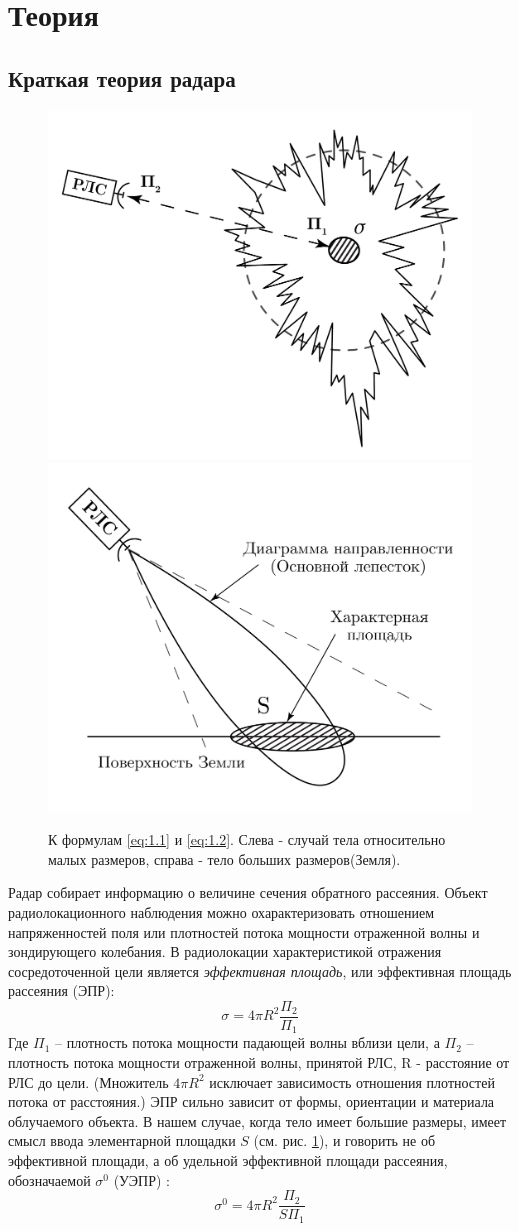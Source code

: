 \section{Теория}

\subsection{Краткая теория радара}
\begin{figure}[h!]
  \centering
  \includegraphics[width = .49\linewidth]{img/rls.pdf}
  \includegraphics[width = .49\linewidth]{img/rls2.pdf}
  \caption{К формулам \eqref{eq:1.1} и \eqref{eq:1.2}. Слева - случай тела относительно малых размеров, справа - тело больших размеров(Земля).}
  \label{fig:1}
\end{figure}
Радар собирает информацию о величине сечения обратного рассеяния. 
Объект радиолокационного наблюдения можно охарактеризовать отношением напряженностей поля или плотностей потока мощности
отраженной волны и зондирующего колебания. В радиолокации характеристикой отражения сосредоточенной цели
является \textit{эффективная площадь}, или эффективная площадь рассеяния (ЭПР)\cite{meln}:
\begin{equation}
  \sigma = 4 \pi R^2 \frac{\Pi_2}{\Pi_1}
  \label{eq:1.1}
\end{equation}
Где $\Pi_1$ – плотность потока мощности падающей волны вблизи цели, а $\Pi_2$ – плотность потока мощности отраженной
волны, принятой РЛС, R - расстояние от РЛС до цели. (Множитель $4 \pi R^2$  исключает зависимость отношения плотностей потока от
расстояния.) ЭПР сильно зависит от формы, ориентации и материала облучаемого объекта. В нашем случае, когда тело имеет
большие размеры, имеет смысл ввода элементарной площадки $S$ (см. рис. \ref{fig:1}), и говорить не об эффективной площади, а об удельной
эффективной площади рассеяния, обозначаемой $\sigma^0$ (УЭПР) :
\begin{equation}
  \sigma^0 = 4 \pi R^2 \frac{\Pi_2}{S\Pi_1}
  \label{eq:1.2}
\end{equation}

